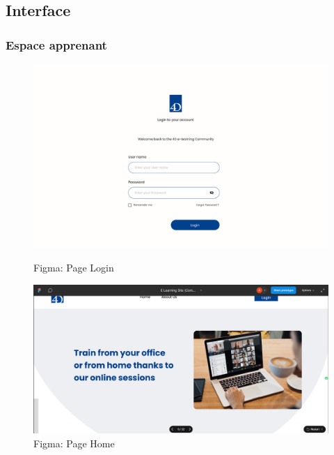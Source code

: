 \subsection{Interface}

\subsubsection{Espace apprenant}

\begin{figure}[H]
    \centering
    \begin{minipage}{0.45\textwidth}
        \centering
        \includegraphics[width=\textwidth]{Figures/login.PNG}
        \caption{Figma: Page Login}
    \end{minipage}
    \hfill
    \begin{minipage}{0.45\textwidth}
        \centering
        \includegraphics[width=\textwidth]{Figures/home.PNG}
        \caption{Figma: Page Home}
    \end{minipage}
\end{figure}

